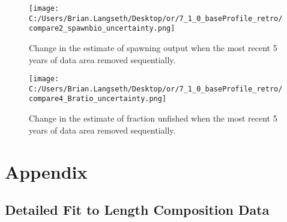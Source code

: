 \documentclass[11pt,
  english,
  a4paper,
]{article}
\begin{document}
\tagmcend\tagstructend


\begin{figure}
\centering
\texttt{[image: C:/Users/Brian.Langseth/Desktop/or/7\_1\_0\_baseProfile\_retro/compare2\_spawnbio\_uncertainty.png]}
\caption{Change in the estimate of spawning output when the most recent 5 years of data area removed sequentially.\label{fig:retro-ssb}}
\end{figure}

\tagmcend\tagstructend


\begin{figure}
\centering
\texttt{[image: C:/Users/Brian.Langseth/Desktop/or/7\_1\_0\_baseProfile\_retro/compare4\_Bratio\_uncertainty.png]}
\caption{Change in the estimate of fraction unfished when the most recent 5 years of data area removed sequentially.\label{fig:retro-depl}}
\end{figure}

\tagmcend\tagstructend

\newpage

\clearpage


\hypertarget{appendix}{%
\section{Appendix}\label{appendix}}

\leavevmode\tagmcend\tagstructend


\hypertarget{detailed-fit-to-length-composition-data}{%
\subsection{Detailed Fit to Length Composition Data}\label{detailed-fit-to-length-composition-data}}

\leavevmode\tagmcend\tagstructend

\end{document}

